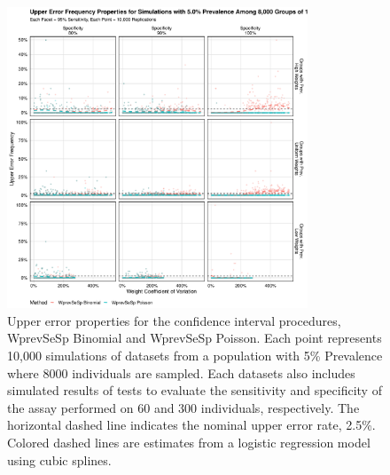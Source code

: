 \documentclass[AMA,STIX1COL]{WileyNJD-v2}
\begin{document}
\begin{figure}
\centering
\includegraphics[width=0.8\textwidth]{figures/imperfect_upper_error_frequency_8000_groups_0_05_prev.pdf}
\caption{Upper error properties for the confidence interval procedures, WprevSeSp Binomial and WprevSeSp Poisson.
Each point represents 10,000 simulations of datasets from a population with 5\% Prevalence where 8000 individuals are sampled.
Each datasets also includes simulated results of tests to evaluate the sensitivity and specificity of the assay performed on 60 and 300 individuals, respectively.
The horizontal dashed line indicates the nominal upper error rate, 2.5\%.
Colored dashed lines are estimates from a logistic regression model using cubic splines.}
\label{fig:imperfect_upper_error_frequency_8000_groups_0_05_prev}
\end{figure}
\end{document}
